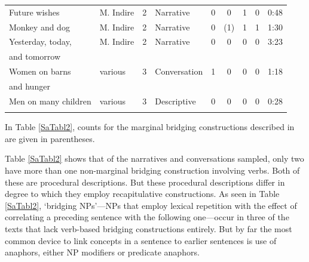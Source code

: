 \documentclass[output=paper]{LSP/langsci}
\begin{document}
\begin{table}
\begin{tabular}{llclccccl}
Future wishes              & M. Indire        & 2     & Narrative      & 0                    & 0                     & 1                & 0                  & 0:48             \\
Monkey and dog             & M. Indire        & 2     & Narrative      & 0                    & (1)                   & 1                & 1                  & 1:30             \\
Yesterday, today,  & M. Indire        & 2     & Narrative      & 0                    & 0                     & 0                & 0                  & 3:23             \\
and tomorrow &         &      &       &                     &                      &                 &                   &             \\
Women on barns   & various          & 3       & Conversation  & 1                    & 0                     & 0                & 0                  & 1:18             \\
 and hunger  &           &        &   &                     &                      &                 &                   &           \\
Men on many children       & various          & 3      & Descriptive    & 0                    & 0                     & 0                & 0                  & 0:28        \\  
\lspbottomrule  
\end{tabular}
\end{table}
%

In Table \ref{SaTabl2}, counts for the marginal bridging constructions described in  are given in parentheses.  
 
Table \ref{SaTabl2} shows that of the narratives and conversations sampled, only two have more than one non-marginal bridging construction involving verbs. Both of these are procedural descriptions. But these procedural descriptions differ in degree to which they employ recapitulative constructions. As seen in Table \ref{SaTabl2}, `bridging NPs'—NPs that employ lexical repetition with the effect of correlating a preceding sentence with the following one—occur in three of the texts that lack verb-based bridging constructions entirely. But by far the most common device to link concepts in a sentence to earlier sentences is use of anaphors, either NP modifiers or predicate anaphors. 
\end{document}
